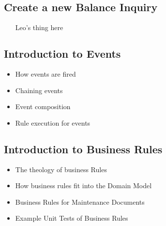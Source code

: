 \documentclass[12pt,notitlepage]{article}
\begin{document}
\begin{s5presentation}
\begin{s5slide}
\begin{ifhtml}
\begin{itemize}
          \end{itemize}
      \end{ifhtml} 
  \W \end{s5slide}
  \W \begin{s5slide}
      \W \section{Create a new Balance Inquiry}
      \begin{ifhtml}
          \begin{itemize}
              \item [Leo's thing here]
          \end{itemize}
      \end{ifhtml} 
  \W \end{s5slide}
  \W \begin{s5slide}
      \W \section{Introduction to Events}
      \begin{ifhtml}
          \begin{itemize}
              \item How events are fired
              \item Chaining events
              \item Event composition
              \item Rule execution for events
          \end{itemize}
      \end{ifhtml} 
  \W \end{s5slide}
  \W \begin{s5slide}
      \W \section{Introduction to Business Rules}
      \begin{ifhtml}
          \begin{itemize}
              \item The theology of business Rules
                \item How business rules fit into the Domain Model
                \item Business Rules for Maintenance Documents
                \item Example Unit Tests of Business Rules
          \end{itemize}
      \end{ifhtml} 

\end{s5slide}
\end{s5presentation}
\end{document}
